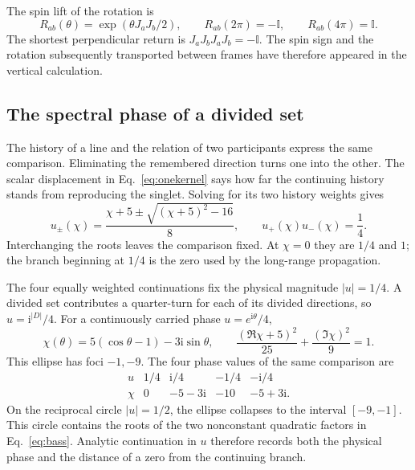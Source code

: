 \documentclass[aps,prx,onecolumn,10pt,notitlepage,nofootinbib,longbibliography]{revtex4-2}
\numberwithin{equation}{section}
\numberwithin{table}{section}
\newcommand{\Id}{\mathbb I}
\newcommand{\ii}{\mathrm i}
\begin{document}
The spin lift of the rotation is
\begin{equation}
 R_{ab}(\theta)=\exp(\theta J_aJ_b/2),\qquad
 R_{ab}(2\pi)=-\Id,\qquad R_{ab}(4\pi)=\Id.
 \label{eq:spinreturn}
\end{equation}
The shortest perpendicular return is
$J_aJ_bJ_aJ_b=-\Id$. The spin sign and the rotation subsequently transported
between frames have therefore appeared in the vertical calculation.

\subsection{The spectral phase of a divided set}
The history of a line and the relation of two participants express the same comparison. Eliminating the remembered direction turns one into the other. The scalar displacement in Eq.~\eqref{eq:onekernel} says how far the continuing history stands from reproducing the singlet. Solving for its two history weights gives
\begin{equation}
 u_\pm(\chi)=\frac{\chi+5\pm\sqrt{(\chi+5)^2-16}}8,
 \qquad u_+(\chi)u_-(\chi)=\frac14.
 \label{eq:reciprocalroots}
\end{equation}
Interchanging the roots leaves the comparison fixed. At $\chi=0$ they are $1/4$ and $1$; the branch beginning at $1/4$ is the zero used by the long-range propagation.

The four equally weighted continuations fix the physical magnitude $|u|=1/4$. A divided set contributes a quarter-turn for each of its divided directions, so $u=\ii^{|D|}/4$. For a continuously carried phase $u=e^{\ii\theta}/4$,
\begin{equation}
 \chi(\theta)=5(\cos\theta-1)-3\ii\sin\theta,
 \qquad \frac{(\Re\chi+5)^2}{25}+\frac{(\Im\chi)^2}{9}=1.
 \label{eq:ellipse}
\end{equation}
This ellipse has foci $-1,-9$. The four phase values of the same comparison are
\begin{equation}
\begin{array}{c|rrrr}
 u&1/4&\ii/4&-1/4&-\ii/4\\\hline
 \chi&0&-5-3\ii&-10&-5+3\ii.
\end{array}
\label{eq:fourquarters}
\end{equation}
On the reciprocal circle $|u|=1/2$, the ellipse collapses to the interval $[-9,-1]$. This circle contains the roots of the two nonconstant quadratic factors in Eq.~\eqref{eq:bass}. Analytic continuation in $u$ therefore records both the physical phase and the distance of a zero from the continuing branch.
\end{document}
